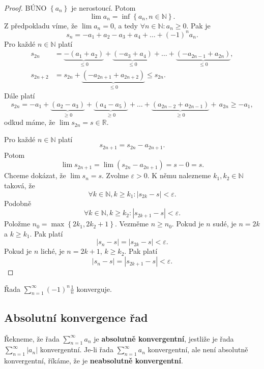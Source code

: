 \begin{proof}
	BÚNO $\left \{ a_n \right \} $ je nerostoucí. Potom
	$$
	    \lim a_n = \inf \left \{ a_n, n \in \mathbb N  \right \}.
	$$
	Z předpokladu víme, že $\lim a_n = 0$, a tedy $\forall n \in \mathbb N : a_n \geq 0$.
	Pak je
	$$
	    s_n = -a_1 + a_2 - a_3 +a_4 + \dots + (-1)^na_n.
	$$
	Pro každé $n\in \mathbb N $ platí
	\begin{align*}
	s_{2n} &= \underbrace{-(a_1+a_2)}_{\leq 0}+\underbrace{(-a_3+a_4)}_{\leq 0}+\dots +\underbrace{(-a_{2n-1}+a_{2n})}_{\leq 0},\\
    s_{2n+2} &= s_{2n} + \underbrace{(-a_{2n+1} + a_{2n+2})}_{\leq 0} \leq s_{2n}.
    \end{align*}
	Dále platí
	$$
	    s_{2n} = -a_1 + \underbrace{(a_2 - a_3)}_{\geq 0} + \underbrace{(a_4  -a_5)}_{\geq 0}+ \dots + \underbrace{(a_{2n-2}+a_{2n-1})}_{\geq 0} + \, a_{2n}\geq -a_1,
	$$
	odkud máme, že $\lim s_{2n}=s \in \mathbb R $.
	\par Pro každé $n \in \mathbb N $ platí
	$$
	    s_{2n+1} = s_{2n}-a_{2n+1}.
	$$
	Potom
	$$
	    \lim s_{2n+1} = \lim(s_{2n}-a_{2n+1}) = s - 0 = s.
	$$
	Chceme dokázat, že $\lim s_n = s$. Zvolme $\varepsilon > 0$. K němu nalezneme
	$k_1, k_2 \in \mathbb N $ taková, že
	$$
	    \forall k \in \mathbb N , k \geq k_1: |s_{2k} - s| < \varepsilon.
	$$
	Podobně
	$$
	    \forall k \in \mathbb N , k \geq k_2: |s_{2k+1}-s| < \varepsilon.
	$$
	Položme $n_0 = \max \left \{ 2k_1, 2k_2 +1 \right \} $. Vezměme $n\geq n_0$. Pokud je $n$ sudé,
	je $n = 2k$ a $k\geq k_1$. Pak platí
	$$
	    |s_n - s| = |s_{2k}-s| < \varepsilon.
	$$
	Pokud je $n$ liché, je $n = 2k+1$, $k\geq k_2$. Pak platí
	$$
	    |s_n-s| = |s_{2k+1}-s| < \varepsilon.
	$$
\end{proof}

\begin{priklad}
Řada $\sum_{n=1}^\infty (-1)^n \frac{1}{n}$ konverguje.
\end{priklad}

\subsection{Absolutní konvergence řad}
\begin{definice}
Řekneme, že řada
$
\sum_{n=1}^{\infty} a_n
$
je \textbf{absolutně konvergentní}, jestliže je řada
$
\sum_{n=1}^{\infty} |a_n|
$
konvergentní. Je-li řada $
\sum_{n=1}^{\infty} a_n
$ konvergentní, ale není absolutně konvergentní, říkáme, že je \textbf{neabsolutně konvergentní}.
\end{definice}

